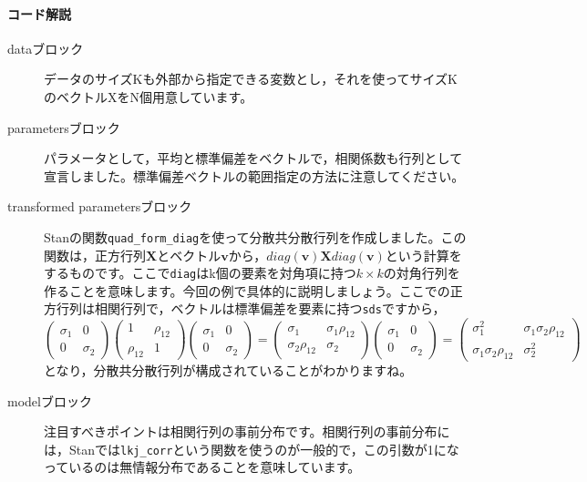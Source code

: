 \documentclass{ltjsbook}
\begin{document}
\paragraph{コード解説}
\begin{description}
	\item[dataブロック] データのサイズKも外部から指定できる変数とし，それを使ってサイズKのベクトルXをN個用意しています。
	\item[parametersブロック] パラメータとして，平均と標準偏差をベクトルで，相関係数も行列として宣言しました。標準偏差ベクトルの範囲指定の方法に注意してください。
	\item[transformed parametersブロック] Stanの関数\verb|quad_form_diag|を使って分散共分散行列を作成しました。この関数は，正方行列$\bm{X}$とベクトル$\bm{v}$から，$diag(\bm{v}) \bm{X} diag(\bm{v})$という計算をするものです。ここで\verb|diag|はk個の要素を対角項に持つ$k \times k$の対角行列を作ることを意味します。今回の例で具体的に説明しましょう。ここでの正方行列は相関行列で，ベクトルは標準偏差を要素に持つ\verb|sds|ですから，
	      \[ \begin{pmatrix}\sigma_1&0\\0&\sigma_2\end{pmatrix}\begin{pmatrix}1&\rho_{12}\\\rho_{12}&1\end{pmatrix}\begin{pmatrix}\sigma_1&0\\0&\sigma_2\end{pmatrix} =
		      \begin{pmatrix} \sigma_1 & \sigma_1\rho_{12}\\ \sigma_2\rho_{12} & \sigma_2\end{pmatrix}\begin{pmatrix}\sigma_1 & 0\\ 0 & \sigma_2\end{pmatrix} =
		      \begin{pmatrix}\sigma_1^2 & \sigma_1\sigma_2\rho_{12} \\ \sigma_1\sigma_2\rho_{12} & \sigma_2^2\end{pmatrix} \]
	      となり，分散共分散行列が構成されていることがわかりますね。
	\item[modelブロック] 注目すべきポイントは相関行列の事前分布です。相関行列の事前分布には，Stanでは\verb|lkj_corr|という関数を使うのが一般的で，この引数が1になっているのは無情報分布であることを意味しています。
\end{description}
\end{document}
